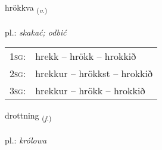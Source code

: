 \documentclass[frontgrid, backgrid]{flacards}\usepackage[]{graphicx}\usepackage[]{xcolor}
\begin{document}
\renewcommand{\flhead}{\vskip5pt \fboxsep=0pt {\small\bfseries\footnotesize Sagnorð | czasownik}}
\renewcommand{\fcfoot}{\vskip5pt \fboxsep=0pt \hspace{2pt}{\small\bfseries\footnotesize 3K}}

\renewcommand{\blhead}{\vskip5pt {\small\bfseries\footnotesize Sagnorð | czasownik }}
\renewcommand{\bcfoot}{\vskip5pt \hspace{2pt}{\small\bfseries\footnotesize 3K}}


{hrökkva \small{\textsubscript{(\textit{v.})}} \\[1ex] %
\textphonetic{[r̥œhkva]} \\
pl.: \emph{skakać; odbić} \\  [2ex]
\renewcommand*{\arraystretch}{0.8}
\begin{tabular}{p{1cm}l}
\textsc{1sg}: & hrekk -- hrökk -- hrokkið \\ 
\textsc{2sg}: & hrekkur -- hrökkst -- hrokkið \\ 
\textsc{3sg}: & hrekkur -- hrökk -- hrokkið \\ 
\end{tabular}
}

\renewcommand{\flhead}{\vskip5pt \fboxsep=0pt {\small\bfseries\footnotesize Nafnorð | rzeczownik}}
\renewcommand{\fcfoot}{\vskip5pt \fboxsep=0pt \hspace{2pt}{\small\bfseries\footnotesize 3K}}

\renewcommand{\blhead}{\vskip5pt {\small\bfseries\footnotesize Nafnorð | rzeczownik }}
\renewcommand{\bcfoot}{\vskip5pt \hspace{2pt}{\small\bfseries\footnotesize 3K}}


{drottning \small{\textsubscript{(\textit{f.})}} \\[1ex] %
\textphonetic{[trɔhtniŋk]} \\
pl.: \emph{królowa} \\  [2ex]
\renewcommand*{\arraystretch}{0.8}
}
\end{document}
